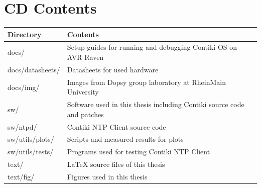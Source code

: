 \chapter{CD Contents}\label{app:cd-contents}
\begin{tabular}{|l|l|}
	\hline
	Directory & Contents \\ \hline
	docs/ & Setup guides for running and debugging Contiki OS on AVR Raven\\
	docs/datasheets/ & Datasheets for used hardware\\
	docs/img/ & Images from Dopsy group laboratory at RheinMain University\\
	sw/ & Software used in this thesis including Contiki source code and patches\\
	sw/ntpd/ & Contiki NTP Client source code\\
	sw/utils/plots/ & Scripts and measured results for plots\\
	sw/utils/tests/ & Programs used for testing Contiki NTP Client\\
	text/ & LaTeX source files of this thesis\\
	text/fig/ & Figures used in this thesis\\
	\hline
\end{tabular}
